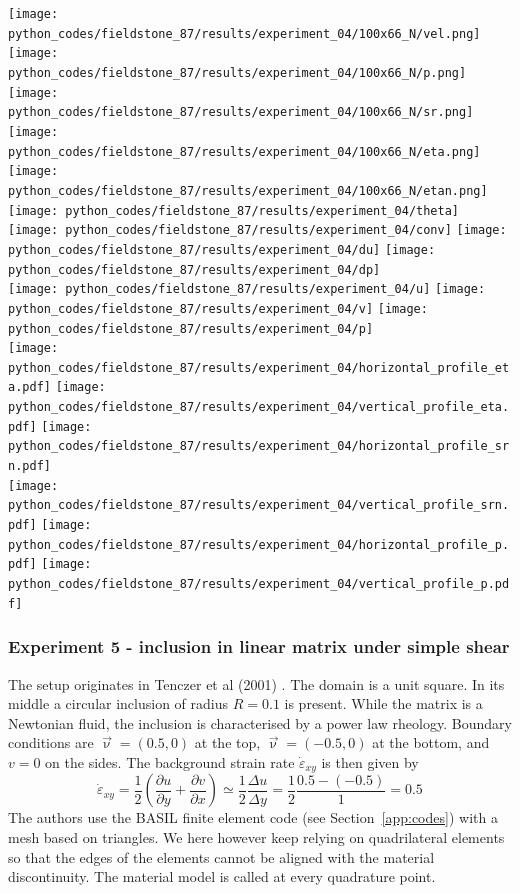 \begin{center}
\texttt{[image: python\_codes/fieldstone\_87/results/experiment\_04/100x66\_N/vel.png]}
\texttt{[image: python\_codes/fieldstone\_87/results/experiment\_04/100x66\_N/p.png]}
\texttt{[image: python\_codes/fieldstone\_87/results/experiment\_04/100x66\_N/sr.png]}\\
\texttt{[image: python\_codes/fieldstone\_87/results/experiment\_04/100x66\_N/eta.png]}
\texttt{[image: python\_codes/fieldstone\_87/results/experiment\_04/100x66\_N/etan.png]}
\texttt{[image: python\_codes/fieldstone\_87/results/experiment\_04/theta]}\\
\texttt{[image: python\_codes/fieldstone\_87/results/experiment\_04/conv]}
\texttt{[image: python\_codes/fieldstone\_87/results/experiment\_04/du]}
\texttt{[image: python\_codes/fieldstone\_87/results/experiment\_04/dp]}\\
\texttt{[image: python\_codes/fieldstone\_87/results/experiment\_04/u]}
\texttt{[image: python\_codes/fieldstone\_87/results/experiment\_04/v]}
\texttt{[image: python\_codes/fieldstone\_87/results/experiment\_04/p]}\\
\texttt{[image: python\_codes/fieldstone\_87/results/experiment\_04/horizontal\_profile\_eta.pdf]}
\texttt{[image: python\_codes/fieldstone\_87/results/experiment\_04/vertical\_profile\_eta.pdf]}
\texttt{[image: python\_codes/fieldstone\_87/results/experiment\_04/horizontal\_profile\_srn.pdf]}\\
\texttt{[image: python\_codes/fieldstone\_87/results/experiment\_04/vertical\_profile\_srn.pdf]}
\texttt{[image: python\_codes/fieldstone\_87/results/experiment\_04/horizontal\_profile\_p.pdf]}
\texttt{[image: python\_codes/fieldstone\_87/results/experiment\_04/vertical\_profile\_p.pdf]}
\end{center}


\newpage
\subsubsection*{Experiment 5 - inclusion in linear matrix under simple shear}

The setup originates in Tenczer et al (2001) \cite{tesb01}. 
The domain is a unit square. In its middle a circular inclusion of radius $R=0.1$
is present. While the matrix is a Newtonian fluid, the inclusion is characterised
by a power law rheology. 
Boundary conditions are $\vec\upnu=(0.5,0)$ at the top, $\vec\upnu=(-0.5,0)$
at the bottom, and $v=0$ on the sides.
The background strain rate $\dot\varepsilon_{xy}$ is then given by
\[
\dot\varepsilon_{xy} = \frac{1}{2}\left( \frac{\partial u}{\partial y}+ \frac{\partial v}{\partial x} \right)
\simeq \frac{1}{2} \frac{\Delta u}{\Delta y}
= \frac{1}{2} \frac{0.5-(-0.5)}{1} = 0.5
\]
The authors use the BASIL finite element code (see Section~\ref{app:codes})
with a mesh based on triangles. We here however 
keep relying on quadrilateral elements so that the edges of the elements cannot be 
aligned with the material discontinuity. 
The material model is called at every quadrature point.  

